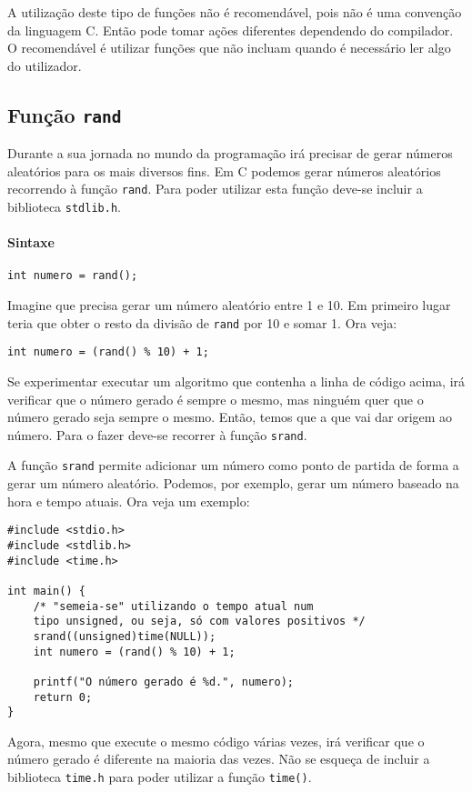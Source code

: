 A utilização deste tipo de funções não é recomendável, pois não é uma convenção da linguagem C. Então pode tomar ações diferentes dependendo do compilador. O recomendável é utilizar funções que não incluam 	 quando é necessário ler algo do utilizador.

\subsection{Função \texttt{rand}}

Durante a sua jornada no mundo da programação irá precisar de gerar números aleatórios para os mais diversos fins. Em C podemos gerar números aleatórios recorrendo à função \texttt{rand}. Para poder utilizar esta função deve-se incluir a biblioteca \texttt{stdlib.h}.

\paragraph{Sintaxe}

\begin{lstlisting}
int numero = rand();
\end{lstlisting}

Imagine que precisa gerar um número aleatório entre 1 e 10. Em primeiro lugar teria que obter o resto da divisão de \texttt{rand} por 10 e somar 1. Ora veja:

\begin{lstlisting}
int numero = (rand() % 10) + 1;
\end{lstlisting}

Se experimentar executar um algoritmo que contenha a linha de código acima, irá verificar que o número gerado é sempre o mesmo, mas ninguém quer que o número gerado seja sempre o mesmo. Então, temos que  a  que vai dar origem ao número. Para o fazer deve-se recorrer à função \texttt{srand}.

A função \texttt{srand} permite adicionar um número como ponto de partida de forma a gerar um número aleatório. Podemos, por exemplo, gerar um número baseado na hora e tempo atuais. Ora veja um exemplo:

\begin{lstlisting}
#include <stdio.h>
#include <stdlib.h>
#include <time.h>

int main() {
	/* "semeia-se" utilizando o tempo atual num 
	tipo unsigned, ou seja, só com valores positivos */
	srand((unsigned)time(NULL));
	int numero = (rand() % 10) + 1;
	
	printf("O número gerado é %d.", numero);
	return 0;
}
\end{lstlisting}

Agora, mesmo que execute o mesmo código várias vezes, irá verificar que o número gerado é diferente na maioria das vezes. Não se esqueça de incluir a biblioteca \texttt{time.h} para poder utilizar a função \texttt{time()}.
